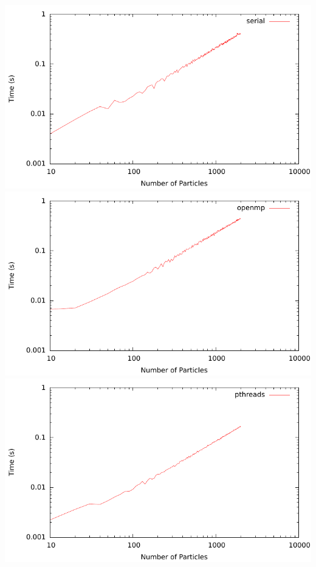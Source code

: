 
\includegraphics{plots/serial.pdf}
\includegraphics{plots/openmp.pdf}
\includegraphics{plots/pthreads.pdf}

